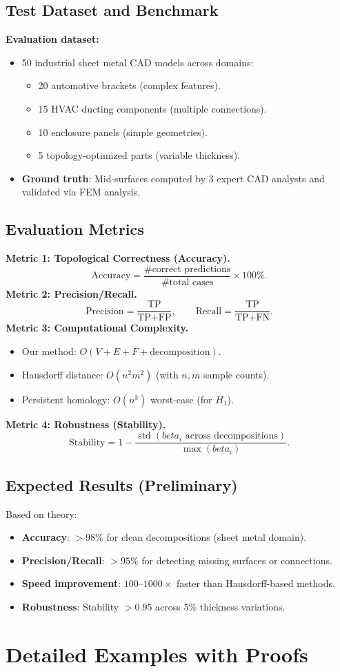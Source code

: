 \documentclass[conference]{IEEEtran}
\begin{document}
\subsection{Test Dataset and Benchmark}
\textbf{Evaluation dataset:}
\begin{itemize}
\item 50 industrial sheet metal CAD models across domains:
\begin{itemize}
\item 20 automotive brackets (complex features).
\item 15 HVAC ducting components (multiple connections).
\item 10 enclosure panels (simple geometries).
\item 5 topology-optimized parts (variable thickness).
\end{itemize}
\item \textbf{Ground truth}: Mid-surfaces computed by 3 expert CAD analysts and validated via FEM analysis.
\end{itemize} \subsection{Evaluation Metrics}
\textbf{Metric 1: Topological Correctness (Accuracy).}
\[
\text{Accuracy} = \frac{\#\text{correct predictions}}{\#\text{total cases}} \times 100\%.
\]
\textbf{Metric 2: Precision/Recall.}
\[
\text{Precision} = \frac{\text{TP}}{\text{TP}+\text{FP}},\qquad
\text{Recall} = \frac{\text{TP}}{\text{TP}+\text{FN}}.
\]
\textbf{Metric 3: Computational Complexity.}
\begin{itemize}
\item Our method: $O(V + E + F + \text{decomposition})$.
\item Hausdorff distance: $O(n^2 m^2)$ (with $n,m$ sample counts).
\item Persistent homology: $O(n^3)$ worst-case (for $H_1$).
\end{itemize}
\textbf{Metric 4: Robustness (Stability).}
\[
\text{Stability} = 1 - \frac{\operatorname{std}(beta_i \text{ across decompositions})}{\max(beta_i)}.
\]
\subsection{Expected Results (Preliminary)}
Based on theory:
\begin{itemize}
\item \textbf{Accuracy}: $>98\%$ for clean decompositions (sheet metal domain).
\item \textbf{Precision/Recall}: $>95\%$ for detecting missing surfaces or connections.
\item \textbf{Speed improvement}: $100$--$1000\times$ faster than Hausdorff-based methods.
\item \textbf{Robustness}: Stability $>0.95$ across 5\% thickness variations.
\end{itemize} \section{Detailed Examples with Proofs}
\end{document}
